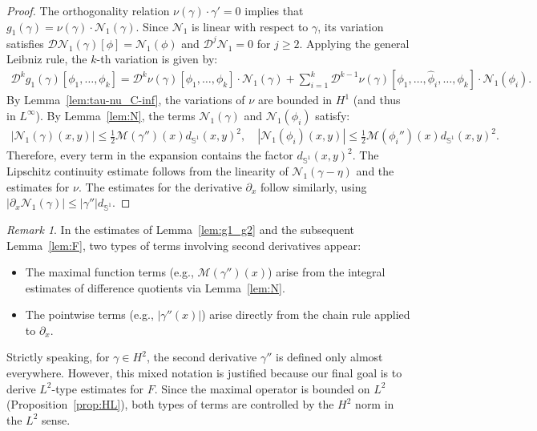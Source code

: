 \documentclass{article}
\theoremstyle{remark}
\newtheorem{remark}[theorem]{Remark}
\theoremstyle{definition}
\numberwithin{equation}{section}
\begin{document}
\begin{proof}
    The orthogonality relation $\nu(\gamma)\cdot\gamma'=0$ implies that $g_1(\gamma) = \nu(\gamma) \cdot \mathcal{N}_1(\gamma)$.
    Since $\mathcal{N}_1$ is linear with respect to $\gamma$, its variation satisfies $\mathcal{D}\mathcal{N}_1(\gamma)[\phi]=\mathcal{N}_1(\phi)$ and $\mathcal{D}^j \mathcal{N}_1 = 0$ for $j \ge 2$.
    Applying the general Leibniz rule, the $k$-th variation is given by:
    \begin{align*}
        \mathcal{D}^k g_1(\gamma)[\phi_1,\ldots,\phi_k]
        =\mathcal{D}^k \nu(\gamma)[\phi_1,\ldots,\phi_k]\cdot\mathcal{N}_1(\gamma)
        +\sum_{i=1}^k \mathcal{D}^{k-1} \nu(\gamma)[\phi_1,\ldots,\hat{\phi}_i,\ldots,\phi_k]\cdot\mathcal{N}_1(\phi_i).
    \end{align*}
    By Lemma~\ref{lem:tau-nu_C-inf}, the variations of $\nu$ are bounded in $H^1$ (and thus in $L^\infty$).
    By Lemma~\ref{lem:N}, the terms $\mathcal{N}_1(\gamma)$ and $\mathcal{N}_1(\phi_i)$ satisfy:
    \begin{align*}
        |\mathcal{N}_1(\gamma)(x,y)| \le \frac{1}{2}\mathcal{M}(\gamma'')(x)d_{\mathbb{S}^1}(x,y)^2, \quad
        |\mathcal{N}_1(\phi_i)(x,y)| \le \frac{1}{2}\mathcal{M}(\phi_i'')(x)d_{\mathbb{S}^1}(x,y)^2.
    \end{align*}
    Therefore, every term in the expansion contains the factor $d_{\mathbb{S}^1}(x,y)^2$.
    The Lipschitz continuity estimate follows from the linearity of $\mathcal{N}_1(\gamma-\eta)$ and the estimates for $\nu$.
    The estimates for the derivative $\partial_x$ follow similarly, using $|\partial_x \mathcal{N}_1(\gamma)| \le |\gamma''| d_{\mathbb{S}^1}$.
\end{proof}

\begin{remark}
    \label{rem:notation_mix}
    In the estimates of Lemma~\ref{lem:g1_g2} and the subsequent Lemma~\ref{lem:F}, two types of terms involving second derivatives appear:
    \begin{itemize}
        \item The maximal function terms (e.g., $\mathcal{M}(\gamma'')(x)$) arise from the integral estimates of difference quotients via Lemma~\ref{lem:N}.
        \item The pointwise terms (e.g., $|\gamma''(x)|$) arise directly from the chain rule applied to $\partial_x$.
    \end{itemize}
    Strictly speaking, for $\gamma \in H^2$, the second derivative $\gamma''$ is defined only almost everywhere.
    However, this mixed notation is justified because our final goal is to derive $L^2$-type estimates for $F$.
    Since the maximal operator is bounded on $L^2$ (Proposition~\ref{prop:HL}), both types of terms are controlled by the $H^2$ norm in the $L^2$ sense.
\end{remark}
\end{document}
